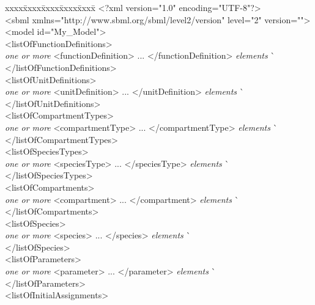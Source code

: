 \vspace*{1.5ex}
\begin{tt}
  \tightspacing
  \small
  \begin{tabbing}
xxxx\=xxxx\=xxxx\=xxxx\=xxxx\=\kill
\+\>
<?xml version="1.0" encoding="UTF-8"?>\\
<sbml xmlns="http://www.sbml.org/sbml/level2/version" level="2" version="">\\
\><model id="My\_Model">\\
\>\><listOfFunctionDefinitions>\\
\>\>\>\textrm{\emph{one or more}} <functionDefinition> ... </functionDefinition> \textrm{\emph{elements}}  \` \sayOptional\\
\>\></listOfFunctionDefinitions>\\
\>\><listOfUnitDefinitions>\\
\>\>\>\textrm{\emph{one or more}} <unitDefinition> ... </unitDefinition> \textrm{\emph{elements}}  \` \sayOptional\\
\>\></listOfUnitDefinitions>\\
\>\><listOfCompartmentTypes>\\
\>\>\>\textrm{\emph{one or more}} <compartmentType> ... </compartmentType> \textrm{\emph{elements}}  \` \sayOptional\\
\>\></listOfCompartmentTypes>\\
\>\><listOfSpeciesTypes>\\
\>\>\>\textrm{\emph{one or more}} <speciesType> ... </speciesType> \textrm{\emph{elements}}  \` \sayOptional\\
\>\></listOfSpeciesTypes>\\
\>\><listOfCompartments>\\
\>\>\>\textrm{\emph{one or more}} <compartment> ... </compartment> \textrm{\emph{elements}}  \` \sayOptional\\
\>\></listOfCompartments>\\
\>\><listOfSpecies>\\
\>\>\>\textrm{\emph{one or more}} <species> ... </species> \textrm{\emph{elements}}  \` \sayOptional\\
\>\></listOfSpecies>\\
\>\><listOfParameters>\\
\>\>\>\textrm{\emph{one or more}} <parameter> ... </parameter> \textrm{\emph{elements}}  \` \sayOptional\\
\>\></listOfParameters>\\
\>\><listOfInitialAssignments>\\

\end{tabbing}
\end{tt}

